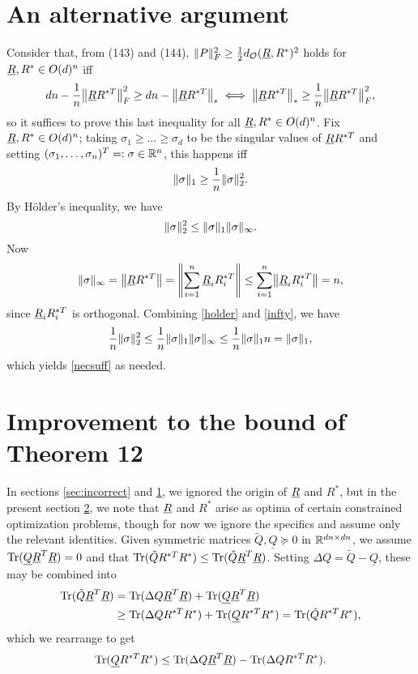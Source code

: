 \documentclass[12pt]{article}
\begin{document}
\section{An alternative argument}
\label{sec:alternative}
Consider that, from (143) and (144), $\lVert P\rVert_F^2 \ge \frac{1}{2} d_{\mathcal{O}}(\underline{R}, R^*)^2$ holds for $\underline{R}, R^* \in O(d)^n$ iff \[dn - \frac{1}{n} \norm*{\uR R^{*T}}_F^2 \ge dn - \norm*{\uR R^{*T}}_* \iff \norm*{\uR R^{*T}}_* \ge \frac{1}{n} \norm*{\uR R^{*T}}_F^2,\] so it suffices to prove this last inequality for all $\underline{R}, R^* \in O(d)^n$.  Fix $\underline{R}, R^* \in O(d)^n$; taking $\sigma_1 \ge \ldots \ge \sigma_d$ to be the singular values of $\underline{R} R^{*T}$ and setting $(\sigma_1, \ldots, \sigma_n)^T =: \sigma \in \mathbb{R}^n$, this happens iff \begin{equation} \lVert\sigma\rVert_1 \ge \frac{1}{n} \lVert\sigma\rVert_2^2. \label{necsuff} \end{equation}  By H\"{o}lder's inequality, we have \begin{equation} \lVert\sigma\rVert_2^2 \le \lVert\sigma\rVert_1 \lVert\sigma\rVert_\infty. \label{holder}\end{equation}  Now \begin{equation} \norm{\sigma}_\infty = \norm*{\uR R^{*T}} = \norm*{\sum_{i = 1}^n \uR_i R^{*T}_i} \le \sum_{i = 1}^n \norm*{\uR_i R^{*T}_i} = n, \label{infty} \end{equation} since $\underline{R}_i R^{*T}_i$ is orthogonal.  Combining \eqref{holder} and \eqref{infty}, we have \[\frac{1}{n} \lVert\sigma\rVert_2^2 \le \frac{1}{n} \lVert\sigma\rVert_1 \lVert\sigma\rVert_\infty \le \frac{1}{n} \lVert\sigma\rVert_1 n = \lVert\sigma\rVert_1,\] which yields \eqref{necsuff} as needed.

\section{Improvement to the bound of Theorem 12}
\label{sec:improve}
In sections \ref{sec:incorrect} and \ref{sec:alternative}, we ignored the origin of $\underline{R}$ and $R^*$, but in the present section \ref{sec:improve}, we note that $\underline{R}$ and $R^*$ arise as optima of certain constrained optimization problems, though for now we ignore the specifics and assume only the relevant identities.  Given symmetric matrices $\tilde{Q}, \underline{Q} \succeq 0$ in $\mathbb{R}^{dn \times dn}$, we assume $\operatorname{Tr}(\underline{Q} \underline{R}^T \underline{R}) = 0$ and that $\operatorname{Tr}(\tilde{Q} R^{*T} R^*) \le \operatorname{Tr}(\tilde{Q} \underline{R}^T \underline{R})$.  Setting $\Delta Q = \tilde{Q} - \underline{Q}$, these may be combined into \begin{align*} \operatorname{Tr}(\tilde{Q} \underline{R}^T \underline{R}) &= \operatorname{Tr}(\Delta Q \underline{R}^T \underline{R}) + \operatorname{Tr}(\underline{Q} \underline{R}^T \underline{R}) \\&\ge \operatorname{Tr}(\Delta Q R^{*T} R^*) + \operatorname{Tr}(\underline{Q} R^{*T} R^*) = \operatorname{Tr}(\tilde{Q} R^{*T} R^*), \end{align*} which we rearrange to get \begin{equation} \operatorname{Tr}(\underline{Q} R^{*T} R^*) \le \operatorname{Tr}(\Delta Q \underline{R}^T \underline{R}) - \operatorname{Tr}(\Delta Q R^{*T} R^*). \label{trinq}\end{equation}
\end{document}
